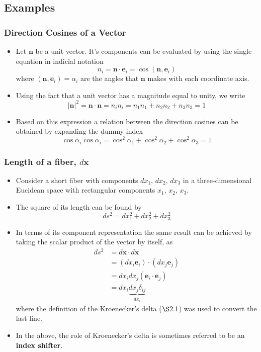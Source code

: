 \documentclass[11pt]{article}
\begin{document}
\subsection*{Examples}
\label{sec:org63a31e9}
\subsubsection*{Direction Cosines of a Vector}
\label{sec:org503de2c}
\begin{itemize}
\item Let \(\boldsymbol{n}\) be a unit vector. It's components can be evaluated by using the single equation in indicial notation
$$ n_i = \boldsymbol{n} \cdot \boldsymbol{e}_i = \cos(\boldsymbol{n}, \boldsymbol{e}_i) $$
where \((\boldsymbol{n}, \boldsymbol{e}_i) = \alpha_i\) are the angles that \(\boldsymbol{n}\) makes with each coordinate axis.

\item Using the fact that a unit vector has a magnitude equal to unity, we write
$$ |\boldsymbol{n}|^2 = \boldsymbol{n} \cdot \boldsymbol{n} = n_i n_i = n_1 n_1 + n_2 n_2 + n_3 n_3 = 1 $$
\item Based on this expression a relation between the direction cosines can be obtained by expanding the dummy index 
$$ \cos\alpha_i \cos\alpha_i = \cos^2\alpha_1 + \cos^2\alpha_2 + \cos^2\alpha_3 = 1 $$
\end{itemize}
\subsubsection*{Length of a fiber, \(d\boldsymbol{x}\)}
\label{sec:orge1fd319}
\begin{itemize}
\item Consider a short fiber with components \(dx_1,\, dx_2,\, dx_3\) in a three-dimensional Eucidean space with rectangular components \(x_1,\, x_2,\, x_3\).
\item The square of its length can be found by
$$ ds^2 = dx_1^2 + dx_2^2 + dx_3^2 $$
\item In terms of its component representation the same result can be achieved by taking the scalar product of the vector by itself, as
\begin{align}
 ds^2 & = d\boldsymbol{x} \cdot d\boldsymbol{x} \\
      & = (dx_i \boldsymbol{e}_i) \cdot (dx_j \boldsymbol{e}_j) \\
      & = dx_i dx_j (\boldsymbol{e}_i \cdot \boldsymbol{e}_j) \\
      & = dx_i \underbrace{dx_j \delta_{ij}}_{dx_i}
\end{align}
where the definition of the Kroenecker's delta (\hyperref[sec:org3420418]{\(\S 2.1\)}) was used to convert the last line.
\item In the above, the role of Kroenecker's delta is sometimes referred to be an \textbf{index shifter}.
\end{itemize}
\end{document}
